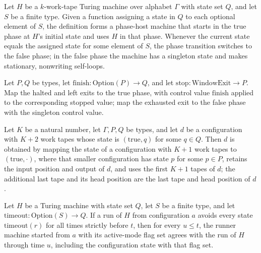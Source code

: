 \begin{definition}
\label{Turing.wr_runnerTM}
\leanok
{}
Let $H$ be a $k$-work-tape Turing machine over alphabet $\Gamma$ with state set $Q$, and
let $S$ be a finite type. Given a function assigning a state in $Q$ to each optional
element of $S$, the definition forms a phase-host machine that starts in the true phase
at $H$’s initial state and uses $H$ in that phase. Whenever the current state equals the
assigned state for some element of $S$, the phase transition switches to the false
phase; in the false phase the machine has a singleton state and makes stationary,
nonwriting self-loops.
\end{definition}

\begin{definition}
\label{Turing.wr_exit}
\leanok
{}
Let $P,Q$ be types, let $\mathrm{finish}:\mathrm{Option}(P)\to Q$, and let
$\mathrm{stop}:\mathrm{WindowExit}\to P$. Map the halted and left exits to the true
phase, with control value $\mathrm{finish}$ applied to the corresponding stopped value;
map the exhausted exit to the false phase with the singleton control value.
\end{definition}

\begin{theorem}
\label{Turing.wr_clockCfg_eta}
\leanok
{}
Let $K$ be a natural number, let $\Gamma,P,Q$ be types, and let $d$ be a configuration
with $K+2$ work tapes whose state is $(\mathrm{true},q)$ for some $q\in Q$. Then $d$ is
obtained by mapping the state of a configuration with $K+1$ work tapes to
$(\mathrm{true},\cdot)$, where that smaller configuration has state $p$ for some $p\in
P$, retains the input position and output of $d$, and uses the first $K+1$ tapes of $d$;
the additional last tape and its head position are the last tape and head position of
$d$.
\end{theorem}

\begin{theorem}
\label{Turing.wr_prefix}
\leanok
{}
Let $H$ be a Turing machine with state set $Q$, let $S$ be a finite type, and let
$\mathrm{timeout}:\mathrm{Option}(S)\to Q$. If a run of $H$ from configuration $a$
avoids every state $\mathrm{timeout}(r)$ for all times strictly before $t$, then for
every $u\le t$, the runner machine started from $a$ with its active-mode flag set agrees
with the run of $H$ through time $u$, including the configuration state with that flag
set.
\end{theorem}


